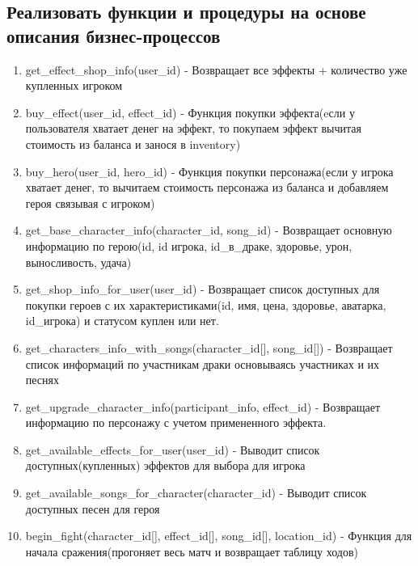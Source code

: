 
\subsection*{Реализовать функции и процедуры на основе описания бизнес-процессов}


\begin{enumerate}
    \item get\_effect\_shop\_info(user\_id) 
    - Возвращает все эффекты + количество уже купленных игроком

    \item buy\_effect(user\_id, effect\_id)
    - Функция покупки эффекта(eсли у пользователя хватает денег на эффект, то покупаем эффект вычитая стоимость из баланса и занося в inventory)

    \item buy\_hero(user\_id, hero\_id)
    - Функция покупки персонажа(если у игрока хватает денег, то вычитаем стоимость персонажа из баланса и добавляем героя связывая с игроком)

    \item get\_base\_character\_info(character\_id, song\_id)
    - Возвращает основную информацию по герою(id, id игрока, id\_в\_драке, здоровье, урон, выносливость, удача)

    \item get\_shop\_info\_for\_user(user\_id)
    - Возвращает список доступных для покупки героев с их характеристиками(id, имя, цена, здоровье, аватарка, id\_игрока) и статусом куплен или нет.

    \item get\_characters\_info\_with\_songs(character\_id[], song\_id[])
    - Возвращает список информаций по участникам драки основываясь участниках и их песнях

    \item get\_upgrade\_character\_info(participant\_info, effect\_id)
    - Возвращает информацию по персонажу с учетом примененного эффекта.

    \item get\_available\_effects\_for\_user(user\_id)
    - Выводит список доступных(купленных) эффектов для выбора для игрока

    \item get\_available\_songs\_for\_character(character\_id)
    - Выводит список доступных песен для героя

    \item begin\_fight(character\_id[], effect\_id[], song\_id[], location\_id)
    - Функция для начала сражения(прогоняет весь матч и возвращает таблицу ходов)

\end{enumerate}

